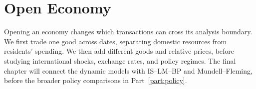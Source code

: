\clearpage
\part{Open Economy}\label{part:open-economy}

Opening an economy changes which transactions can cross its analysis boundary.
We first trade one good across dates, separating domestic resources from
residents' spending. We then add different goods and relative prices, before
studying international shocks, exchange rates, and policy regimes. The final
chapter will connect the dynamic models with IS--LM--BP and Mundell--Fleming,
before the broader policy comparisons in Part~\ref{part:policy}.




